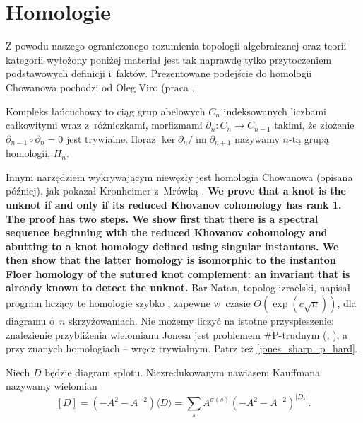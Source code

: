\section{Homologie} %

Z powodu naszego ograniczonego rozumienia topologii algebraicznej oraz teorii kategorii
wyłożony poniżej materiał jest tak naprawdę tylko przytoczeniem podstawowych definicji i~faktów.
Prezentowane podejście do homologii Chowanowa pochodzi od Oleg Viro (praca \cite{viro04}.

Kompleks łańcuchowy to ciąg grup abelowych $C_n$ indeksowanych liczbami całkowitymi
wraz z~różniczkami, morfizmami $\partial_n \colon C_n \to C_{n-1}$ takimi,
że złożenie $\partial_{n-1} \circ \partial_n = 0$ jest trywialne.
Iloraz $\ker \partial_n / \operatorname{im} \partial_{n+1}$ nazywamy $n$-tą grupą homologii, $H_n$.

Innym narzędziem wykrywającym niewęzły jest homologia Chowanowa (opisana później),
jak pokazał Kronheimer z~Mrówką \cite{kronheimer11}.
\textbf{We prove that a knot is the unknot if and only if its reduced Khovanov cohomology has rank 1. The proof has two steps. We show first that there is a spectral sequence beginning with the reduced Khovanov cohomology and abutting to a knot homology defined using singular instantons. We then show that the latter homology is isomorphic to the instanton Floer homology of the sutured knot complement: an invariant that is already known to detect the unknot.}
Bar-Natan, topolog izraelski, napisał program liczący te homologie szybko \cite{barnatan07},
zapewne w~czasie $O(\exp(c \sqrt n))$, dla diagramu o~$n$ skrzyżowaniach.
Nie możemy liczyć na istotne przyspieszenie:
znalezienie przybliżenia wielomianu Jonesa jest problemem \#P-trudnym (\cite{kuperberg15}, \cite{vertigan05}),
a przy znanych homologiach -- wręcz trywialnym.
Patrz też \ref{jones_sharp_p_hard}.


\begin{definition}
    Niech $D$ będzie diagram splotu.
    Niezredukowanym nawiasem Kauffmana nazywamy wielomian
    \[
        [D] = (-A^2 - A^{-2}) \langle D \rangle = \sum_s A^{\sigma(s)} (-A^2 - A^{-2})^{|D_s|}.
    \]
\end{definition}

